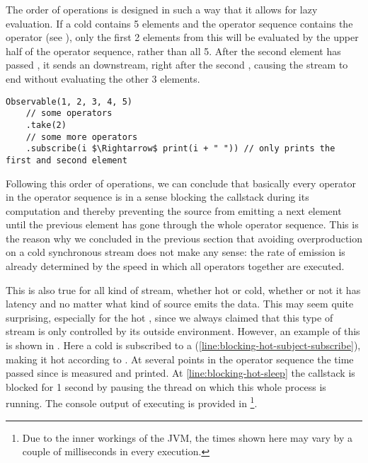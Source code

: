 The order of operations is designed in such a way that it allows for lazy evaluation. If a cold \obs contains 5 elements and the operator sequence contains the operator  (see ), only the first 2 elements from this \obs will be evaluated by the upper half of the operator sequence, rather than all 5. After the second element has passed , it sends an  downstream, right after the second , causing the stream to end without evaluating the other 3 elements.

\begin{minipage}{\linewidth}
\begin{lstlisting}[style=ScalaStyle, caption={Lazy evaluation}, label={lst:lazy}]
Observable(1, 2, 3, 4, 5)
    // some operators
    .take(2)
    // some more operators
    .subscribe(i $\Rightarrow$ print(i + " ")) // only prints the first and second element
\end{lstlisting}
\end{minipage}

Following this order of operations, we can conclude that basically every operator in the operator sequence is in a sense blocking the callstack during its computation and thereby preventing the source from emitting a next element until the previous element has gone through the whole operator sequence. This is the reason why we concluded in the previous section that avoiding overproduction on a cold synchronous stream does not make any sense: the rate of emission is already determined by the speed in which all operators together are executed.

This is also true for all kind of stream, whether hot or cold, whether or not it has latency and no matter what kind of source emits the data. This may seem quite surprising, especially for the hot \obs, since we always claimed that this type of stream is only controlled by its outside environment. However, an example of this is shown in . Here a cold \obs is subscribed to a \subj (\cref{line:blocking-hot-subject-subscribe}), making it hot according to . At several points in the operator sequence the time passed since  is measured and printed. At \cref{line:blocking-hot-sleep} the callstack is blocked for 1 second by pausing the thread on which this whole process is running. The console output of executing  is provided in \footnote{Due to the inner workings of the JVM, the times shown here may vary by a couple of milliseconds in every execution.}.

